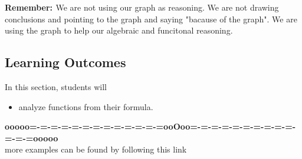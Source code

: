 \documentclass{ximera}
\begin{document}
\textbf{\textcolor{red!80!black}{Remember: }}  We are not using our graph as reasoning.  We are not drawing conclusions and pointing to the graph and saying "bacause of the graph".  We are using the graph to help our algebraic and funcitonal reasoning.


\subsection{Learning Outcomes}


\begin{sectionOutcomes}
In this section, students will 

\begin{itemize}
\item analyze functions from their formula.
\end{itemize}
\end{sectionOutcomes}











\begin{center}
\textbf{\textcolor{green!50!black}{ooooo=-=-=-=-=-=-=-=-=-=-=-=-=ooOoo=-=-=-=-=-=-=-=-=-=-=-=-=ooooo}} \\

more examples can be found by following this link\\ 

\end{center}
\end{document}
